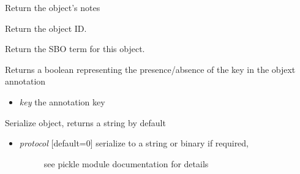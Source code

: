\documentclass[a4paper,11pt,english]{sphinxmanual}
\begin{document}
\begin{fulllineitems}
\begin{fulllineitems}
\end{fulllineitems}


\begin{fulllineitems}
\label{modules_doc:cbmpy.CBModel.Fbase.getNotes}
Return the object's notes

\end{fulllineitems}


\begin{fulllineitems}
\label{modules_doc:cbmpy.CBModel.Fbase.getPid}
Return the object ID.

\end{fulllineitems}


\begin{fulllineitems}
\label{modules_doc:cbmpy.CBModel.Fbase.getSBOterm}
Return the SBO term for this object.

\end{fulllineitems}


\begin{fulllineitems}
\label{modules_doc:cbmpy.CBModel.Fbase.hasAnnotation}
Returns a boolean representing the presence/absence of the key in the objext annotation
\begin{itemize}
\item {} 
\emph{key} the annotation key

\end{itemize}

\end{fulllineitems}


\begin{fulllineitems}
\label{modules_doc:cbmpy.CBModel.Fbase.serialize}
Serialize object, returns a string by default
\begin{itemize}
\item {} \begin{description}
\item[{\emph{protocol} {[}default=0{]} serialize to a string or binary if required,}] \leavevmode
see pickle module documentation for details


\end{description}
\end{itemize}
\end{fulllineitems}
\end{fulllineitems}
\end{document}
